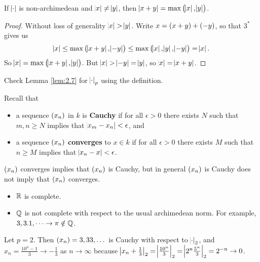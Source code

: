 \begin{lemma}
\label{lem:2.7}
If $ \abs{\cdot} $ is non-archimedean and $ \abs{x} \ne \abs{y} $, then $ \abs{x + y} = \max\br{\abs{x}, \abs{y}} $.
\end{lemma}

\begin{proof}
Without loss of generality $ \abs{x} > \abs{y} $. Write $ x = \br{x + y} + \br{-y} $, so that $ 3^* $ gives us
$$ \abs{x} \le \max\br{\abs{x + y}, \abs{-y}} \le \max\br{\abs{x}, \abs{y}, \abs{-y}} = \abs{x}. $$
So $ \abs{x} = \max\br{\abs{x + y}, \abs{y}} $. But $ \abs{x} > \abs{-y} = \abs{y} $, so $ \abs{x} = \abs{x + y} $.
\end{proof}

\begin{exercise}
Check Lemma \ref{lem:2.7} for $ \abs{\cdot}_p $ using the definition.
\end{exercise}

\pagebreak

Recall that
\begin{itemize}
\item a sequence $ \br{x_n} $ in $ k $ is \textbf{Cauchy} if for all $ \epsilon > 0 $ there exists $ N $ such that $ m, n \ge N $ implies that $ \abs{x_m - x_n} < \epsilon $, and
\item a sequence $ \br{x_n} $ \textbf{converges} to $ x \in k $ if for all $ \epsilon > 0 $ there exists $ M $ such that $ n \ge M $ implies that $ \abs{x_n - x} < \epsilon $.
\end{itemize}
$ \br{x_n} $ converges implies that $ \br{x_n} $ is Cauchy, but in general $ \br{x_n} $ is Cauchy does not imply that $ \br{x_n} $ converges.

\begin{example*}
\hfill
\begin{itemize}
\item $ \mathbb{R} $ is complete.
\item $ \mathbb{Q} $ is not complete with respect to the usual archimedean norm. For example, $ 3, 3.1, \dots \to \pi \notin \mathbb{Q} $.
\end{itemize}
\end{example*}

\begin{example}
Let $ p = 2 $. Then $ \br{x_n} = 3, 33, \dots $ is Cauchy with respect to $ \abs{\cdot}_2 $, and $ x_n = \tfrac{10^n - 1}{3} \to -\tfrac{1}{3} $ as $ n \to \infty $ because $ \abs{x_n + \tfrac{1}{3}}_2 = \abs{\tfrac{10^n}{3}}_2 = \abs{2^n\tfrac{5^n}{3}}_2 = 2^{-n} \to 0 $.
\end{example}

